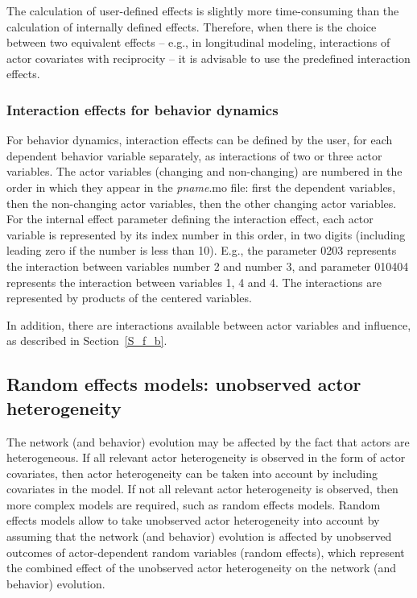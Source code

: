 \documentclass[a4paper,fleqn]{article}
\newcommand{\+}{\, + \,}
\begin{document}
{The calculation of user-defined effects is slightly more time-consuming
than the calculation of internally defined effects. Therefore, when there
is the choice between two equivalent effects -- e.g.,
in longitudinal modeling, interactions
of actor covariates with reciprocity -- it is advisable to use
the predefined interaction effects.

\subsubsection{Interaction effects for behavior dynamics}

For behavior dynamics, interaction effects can be defined
by the user, for each dependent behavior variable separately,
as interactions of two or three actor variables.
The actor variables (changing and non-changing) are numbered
in the order in which they appear in the \textsf{{\em pname}.mo} file:
first the dependent variables, then the non-changing actor variables,
then the other changing actor variables.
For the internal effect parameter defining the interaction effect,
each actor variable is represented by its index number
in this order, in two digits (including leading zero
if the number is less than 10).
E.g., the parameter 0203 represents the interaction between variables
number 2 and number 3, and parameter 010404 represents the interaction
between variables 1, 4 and 4. The interactions are represented
by products of the centered variables.

In addition, there are interactions available between actor variables
and influence, as described in Section~\ref{S_f_b}.


\begin{screen}
\newpage
\end{screen}
\begin{print}
\end{print}
\subsection{Random effects models: unobserved actor heterogeneity}

The network (and behavior) evolution may be affected by the fact that actors are
heterogeneous.
If all relevant actor heterogeneity is observed in the form of actor covariates,
then actor heterogeneity can be taken into account by including covariates in the model.
If not all relevant actor heterogeneity is observed,
then more complex models are required, such as random effects models.
Random effects models \citep[see][]{SchweinbergerSnijders07b} allow to take
unobserved actor heterogeneity into account
by assuming that the network (and behavior) evolution is affected by unobserved
outcomes of actor-dependent random variables (random effects),
which represent the combined effect of the unobserved actor
heterogeneity on the network (and behavior) evolution.

}
\end{document}
